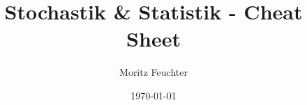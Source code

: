 \documentclass[a4paper,11pt]{article}
\title{Stochastik \& Statistik - Cheat Sheet}
\author{Moritz Feuchter}
\date{\today}
\begin{document}
\maketitle

\begin{multicols*}{2}

\raggedcolumns

\raggedcolumns
\end{multicols*}
\end{document}
